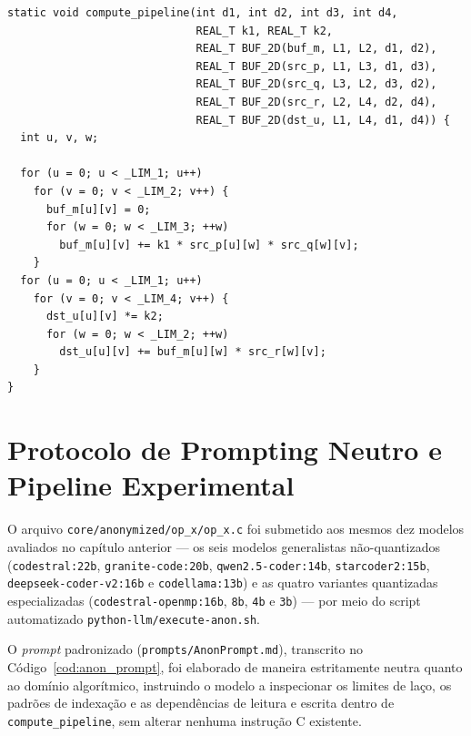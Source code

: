 \begin{lstlisting}[style=C, basicstyle=\scriptsize, label=cod:anon_compute_pipeline, caption={Núcleo computacional anonimizado \texttt{compute\_pipeline} (\texttt{core/anonymized/op\_x/op\_x.c}) submetido aos LLMs}]
static void compute_pipeline(int d1, int d2, int d3, int d4,
                             REAL_T k1, REAL_T k2,
                             REAL_T BUF_2D(buf_m, L1, L2, d1, d2),
                             REAL_T BUF_2D(src_p, L1, L3, d1, d3),
                             REAL_T BUF_2D(src_q, L3, L2, d3, d2),
                             REAL_T BUF_2D(src_r, L2, L4, d2, d4),
                             REAL_T BUF_2D(dst_u, L1, L4, d1, d4)) {
  int u, v, w;

  for (u = 0; u < _LIM_1; u++)
    for (v = 0; v < _LIM_2; v++) {
      buf_m[u][v] = 0;
      for (w = 0; w < _LIM_3; ++w)
        buf_m[u][v] += k1 * src_p[u][w] * src_q[w][v];
    }
  for (u = 0; u < _LIM_1; u++)
    for (v = 0; v < _LIM_4; v++) {
      dst_u[u][v] *= k2;
      for (w = 0; w < _LIM_2; ++w)
        dst_u[u][v] += buf_m[u][w] * src_r[w][v];
    }
}
\end{lstlisting}

\section{Protocolo de Prompting Neutro e Pipeline Experimental}
\label{sec:anon_prompt}

O arquivo \texttt{core/anonymized/op\_x/op\_x.c} foi submetido aos mesmos dez modelos avaliados no capítulo anterior --- os seis modelos generalistas não-quantizados (\texttt{codestral:22b}, \texttt{granite-code:20b}, \texttt{qwen2.5-coder:14b}, \texttt{starcoder2:15b}, \texttt{deepseek-coder-v2:16b} e \texttt{codellama:13b}) e as quatro variantes quantizadas especializadas (\texttt{codestral-openmp:16b}, \texttt{8b}, \texttt{4b} e \texttt{3b}) --- por meio do script automatizado \texttt{python-llm/execute-anon.sh}.

O \textit{prompt} padronizado (\texttt{prompts/AnonPrompt.md}), transcrito no Código~\ref{cod:anon_prompt}, foi elaborado de maneira estritamente neutra quanto ao domínio algorítmico, instruindo o modelo a inspecionar os limites de laço, os padrões de indexação e as dependências de leitura e escrita dentro de \texttt{compute\_pipeline}, sem alterar nenhuma instrução C existente.

